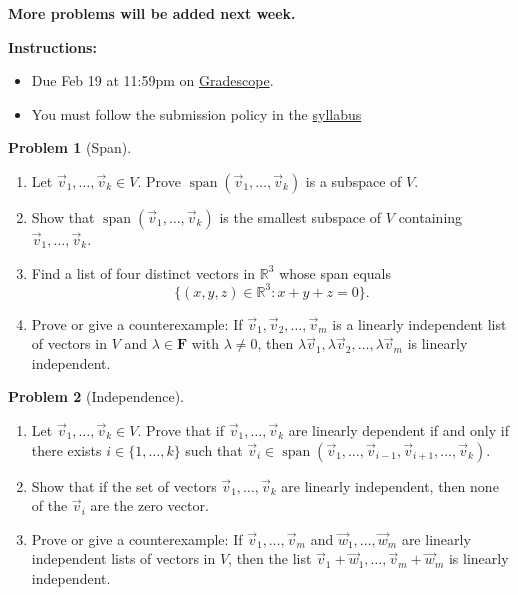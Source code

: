 \documentclass[12pt]{article}
\theoremstyle{definition}
\newtheorem{problem}{Problem}
\begin{document}
\textbf{\Large{}}
    
\vspace{-1.8em}
\hrulefill

\textbf{\color{red}More problems will be added next week.}

\textbf{Instructions:}
    \begin{itemize}
        \item Due Feb 19 at 11:59pm on \href{https://www.gradescope.com/courses/709136}{Gradescope}.
        \item You must follow the submission policy in the \href{https://courses.chen.pw/la_s2024/syllabus.html}{syllabus} 
\end{itemize}
   
\vspace{.5em}

\begin{problem}[Span]~
\begin{enumerate}
\item Let $\vec{v}_1, \ldots, \vec{v}_k \in V$. Prove $\operatorname{span}(\vec{v}_1, \ldots, \vec{v}_k)$ is a subspace of $V$.

\item Show that $\operatorname{span}(\vec{v}_1, \ldots, \vec{v}_k)$ is the smallest subspace of $V$ containing $\vec{v}_1, \ldots, \vec{v}_k$.

\item Find a list of four distinct vectors in $\mathbb{R}^3$ whose span equals 
\[ \{ (x,y,z) \in \mathbb{R}^3 : x+y+z = 0\}. \]

\item Prove or give a counterexample: If $\vec{v}_1, \vec{v}_2, \ldots, \vec{v}_m$ is a linearly independent list of vectors in $V$ and $\lambda \in \mathbf{F}$ with $\lambda \neq 0$, then $\lambda \vec{v}_1, \lambda \vec{v}_2, \ldots, \lambda \vec{v}_m$ is linearly independent.
\end{enumerate}
\end{problem}

\begin{problem}[Independence]~
\begin{enumerate}
    \item Let $\vec{v}_1, \ldots, \vec{v}_k \in V$. Prove that if $\vec{v}_1, \ldots, \vec{v}_k$ are linearly dependent if and only if there exists $i \in \{1, \ldots, k\}$ such that $\vec{v}_i \in \operatorname{span}(\vec{v}_1, \ldots, \vec{v}_{i-1}, \vec{v}_{i+1}, \ldots, \vec{v}_k)$.
    
    \item Show that if the set of vectors $\vec{v}_1, \ldots, \vec{v}_k$ are linearly independent, then none of the $\vec{v}_i$ are the zero vector.
    
    \item Prove or give a counterexample: If $\vec{v}_1, \ldots, \vec{v}_m$ and $\vec{w}_1, \ldots, \vec{w}_m$ are linearly independent lists of vectors in $V$, then the list $\vec{v}_1+\vec{w}_1, \ldots, \vec{v}_m+\vec{w}_m$ is linearly independent.
    \end{enumerate}
\end{problem}
\end{document}
